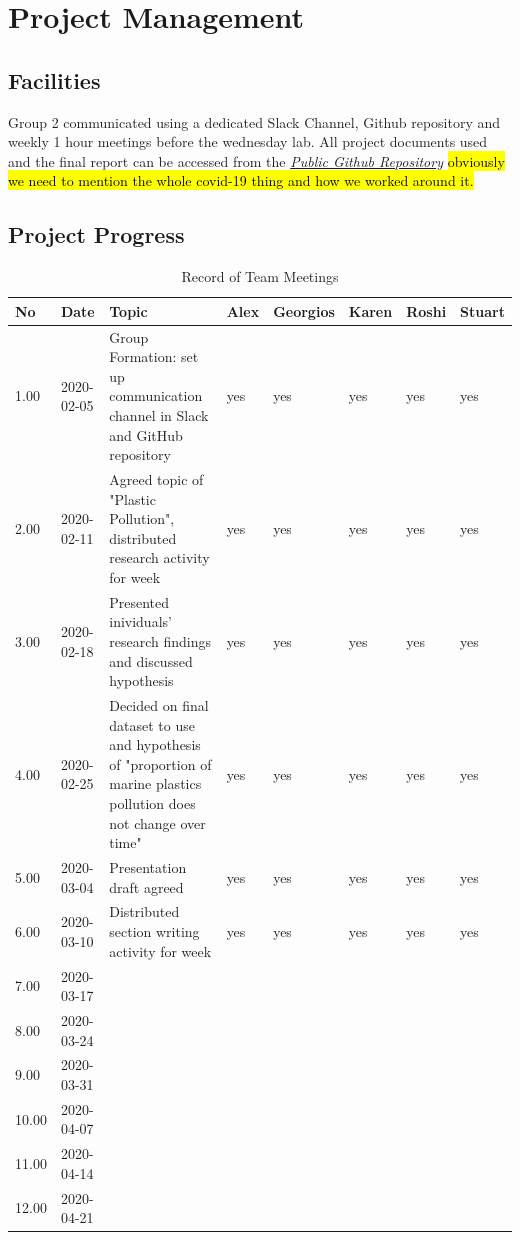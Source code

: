 \documentclass[10pt]{article}\usepackage[]{graphicx}\usepackage[]{color}
\begin{document}
\pagebreak
\section{Project Management}\label{mgt}
\subsection{Facilities}
Group 2 communicated using a dedicated Slack Channel, Github repository and weekly 1 hour meetings before the wednesday lab.
All project documents used and the final report can be accessed from the \textit{\href{https://github.com/KarenJewell/CMM507Group2}{Public Github Repository}}
\hl{obviously we need to mention the whole covid-19 thing and how we worked around it.}

\subsection{Project Progress}

\begin{table}[ht]
\centering
\caption{Record of Team Meetings} 
\label{tab:one}
\begin{tabular}{llp{8cm}lllll}
  \hline
No & Date & Topic & Alex & Georgios & Karen & Roshi & Stuart \\ 
  \hline
1.00 & 2020-02-05 & Group Formation: set up communication channel in Slack and GitHub repository & yes & yes & yes & yes & yes \\ 
  2.00 & 2020-02-11 & Agreed topic of "Plastic Pollution", distributed research activity for week & yes & yes & yes & yes & yes \\ 
  3.00 & 2020-02-18 & Presented inividuals' research findings and discussed hypothesis & yes & yes & yes & yes & yes \\ 
  4.00 & 2020-02-25 & Decided on final dataset to use and hypothesis of "proportion of marine plastics pollution does not change over time" & yes & yes & yes & yes & yes \\ 
  5.00 & 2020-03-04 & Presentation draft agreed & yes & yes & yes & yes & yes \\ 
  6.00 & 2020-03-10 & Distributed section writing activity for week & yes & yes & yes & yes & yes \\ 
  7.00 & 2020-03-17 &  &  &  &  &  &  \\ 
  8.00 & 2020-03-24 &  &  &  &  &  &  \\ 
  9.00 & 2020-03-31 &  &  &  &  &  &  \\ 
  10.00 & 2020-04-07 &  &  &  &  &  &  \\ 
  11.00 & 2020-04-14 &  &  &  &  &  &  \\ 
  12.00 & 2020-04-21 &  &  &  &  &  &  \\ 
   \hline
\end{tabular}
\end{table}
\end{document}
